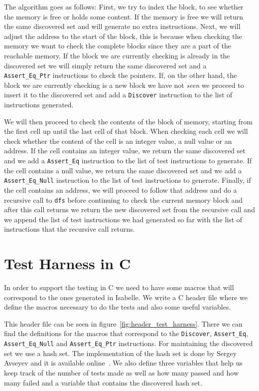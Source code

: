The algorithm goes as follows:
First, we try to index the block, to see whether the memory is free or holds some content.
If the memory is free we will return the same discovered set and will generate no extra instructions.
Next, we will adjust the address to the start of the block, this is because when checking the memory we want to check the complete blocks since they are a part of the reachable memory.
If the block we are currently checking is already in the discovered set we will simply return the same discovered set and a \verb|Assert_Eq_Ptr| instructions to check the pointers.
If, on the other hand, the block we are currently checking is a new block we have not \textit{seen} we proceed to insert it to the discovered set and add a \verb|Discover| instruction to the list of instructions generated.

We will then proceed to check the contents of the block of memory, starting from the first cell up until the last cell of that block.
When checking each cell we will check whether the content of the cell is an integer value, a null value or an address.
If the cell contains an integer value, we return the same discovered set and we add a \verb|Assert_Eq| instruction to the list of test instructions to generate.
If the cell contains a null value, we return the same discovered set and we add a \verb|Assert_Eq_Null| instruction to the list of test instructions to generate.
Finally, if the cell contains an address, we will proceed to follow that address and do a recursive call to \verb|dfs| before continuing to check the current memory block and after this call returns we return the new discovered set from the recursive call and we append the list of test instructions we had generated so far with the list of instructions that the recursive call returns.


\section{Test Harness in C}

In order to support the testing in C we need to have some macros that will correspond to the ones generated in Isabelle.
We write a C header file where we define the macros necessary to do the tests and also some useful variables.

This header file can be seen in figure~\ref{fig:header_test_harness}.
There we can find the definitions for the macros that correspond to the \verb|Discover|, \verb|Assert_Eq|, \verb|Assert_Eq_Null| and \verb|Assert_Eq_Ptr| instructions.
For maintaining the discovered set we use a hash set.
The implementation of the hash set is done by Sergey Avseyev and it is available online~\parencite{hashset}.
We also define three variables that help us keep track of the number of tests made as well as how many passed and how many failed and a variable that contains the discovered hash set.



